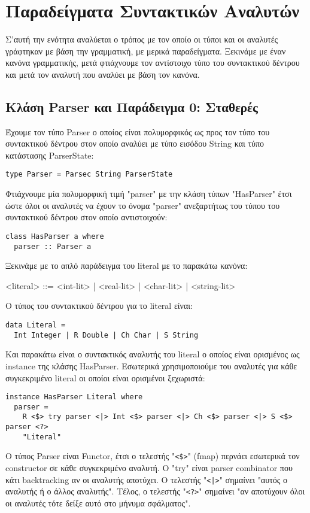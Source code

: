 \documentclass[diploma]{softlab-thesis}
\begin{document}
\newpage

\section{Παραδείγματα Συντακτικών Αναλυτών}

Σ'αυτή την ενότητα αναλύεται ο τρόπος με τον οποίο οι τύποι και οι αναλυτές
γράφτηκαν με βάση την γραμματική, με μερικά παραδείγματα. Ξεκινάμε με έναν
κανόνα γραμματικής, μετά φτιάχνουμε τον αντίστοιχο τύπο του συντακτικού δέντρου
και μετά τον αναλυτή που αναλύει με βάση τον κανόνα.

\subsection{Κλάση Parser και Παράδειγμα 0: Σταθερές}

Έχουμε τον τύπο Parser ο οποίος είναι πολυμορφικός ως προς τον τύπο του
συντακτικού δέντρου στον οποίο αναλύει με τύπο εισόδου String και τύπο
κατάστασης ParserState:
\begin{verbatim}
type Parser = Parsec String ParserState

\end{verbatim}
Φτιάχνουμε μία πολυμορφική τιμή "parser" με την κλάση τύπων "HasParser"
έτσι ώστε όλοι οι αναλυτές να έχουν το όνομα "parser" ανεξαρτήτως του
τύπου του συντακτικού δέντρου στον οποίο αντιστοιχούν:
\begin{verbatim}
class HasParser a where
  parser :: Parser a

\end{verbatim}
Ξεκινάμε με το απλό παράδειγμα του literal με το παρακάτω κανόνα:
\begin{grammar}
<literal> ::= <int-lit> | <real-lit> | <char-lit> | <string-lit>\\
\end{grammar}
Ο τύπος του συντακτικού δέντρου για το literal είναι:
\begin{verbatim}
data Literal =
  Int Integer | R Double | Ch Char | S String

\end{verbatim}
Και παρακάτω είναι ο συντακτικός αναλυτής του literal ο οποίος είναι ορισμένος
ως instance της κλάσης HasParser. Εσωτερικά χρησιμοποιούμε του αναλυτές για
κάθε συγκεκριμένο literal οι οποίοι είναι ορισμένοι ξεχωριστά:
\begin{verbatim}
instance HasParser Literal where
  parser =
    R <$> try parser <|> Int <$> parser <|> Ch <$> parser <|> S <$> parser <?>
    "Literal"

\end{verbatim}
Ο τύπος Parser είναι Functor,  έτσι ο τελεστής "\verb|<$>|" (fmap) περνάει
εσωτερικά τον constructor σε κάθε συγκεκριμένο αναλυτή. Ο "try" είναι
parser combinator που κάτι backtracking αν οι αναλυτής αποτύχει. Ο τελεστής
"\texttt{<|>}" σημαίνει "αυτός ο αναλυτής ή ο άλλος αναλυτής". Τέλος,
ο τελεστής "\verb|<?>|" σημαίνει "αν αποτύχουν όλοι οι αναλυτές τότε
δείξε αυτό στο μήνυμα σφάλματος".
\end{document}
